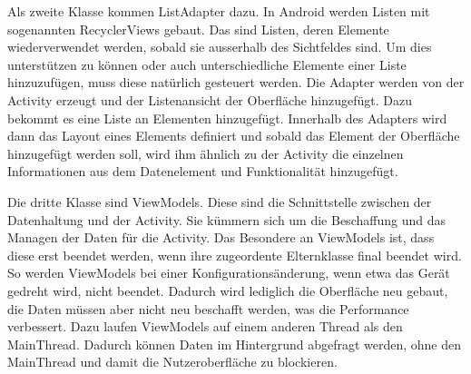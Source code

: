 Als zweite Klasse kommen ListAdapter dazu. In Android werden Listen mit sogenannten RecyclerViews gebaut. Das sind Listen, deren Elemente wiederverwendet werden, sobald sie ausserhalb des Sichtfeldes sind. Um dies unterstützen zu können oder auch unterschiedliche Elemente einer Liste hinzuzufügen, muss diese natürlich gesteuert werden. Die Adapter werden von der Activity erzeugt und der Listenansicht der Oberfläche hinzugefügt. Dazu bekommt es eine Liste an Elementen hinzugefügt.
Innerhalb des Adapters wird dann das Layout eines Elements definiert und sobald das Element der Oberfläche hinzugefügt werden soll, wird ihm ähnlich zu der Activity die einzelnen Informationen aus dem Datenelement und Funktionalität hinzugefügt.

Die dritte Klasse sind ViewModels. Diese sind die Schnittstelle zwischen der Datenhaltung und der Activity. Sie kümmern sich um die Beschaffung und das Managen der Daten für die Activity. Das Besondere an ViewModels ist, dass diese erst beendet werden, wenn ihre zugeordente Elternklasse final beendet wird. So werden ViewModels bei einer Konfigurationsänderung, wenn etwa das Gerät gedreht wird, nicht beendet. Dadurch wird lediglich die Oberfläche neu gebaut, die Daten müssen aber nicht neu beschafft werden, was die Performance verbessert. Dazu laufen ViewModels auf einem anderen Thread als den MainThread. Dadurch können Daten im Hintergrund abgefragt werden, ohne den MainThread und damit die Nutzeroberfläche zu blockieren.


